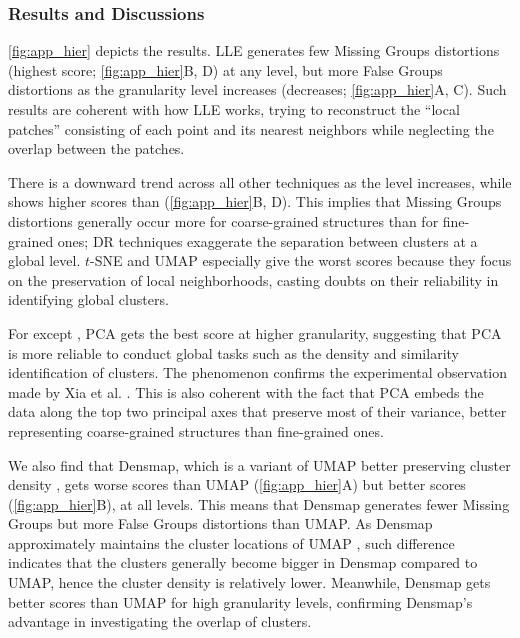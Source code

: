 \subsubsection{Results and Discussions}
\autoref{fig:app_hier} depicts the results. 
LLE generates few Missing Groups distortions (highest \lc score; \autoref{fig:app_hier}B, D) at any level, but more False Groups distortions as the granularity level increases (\lt decreases; \autoref{fig:app_hier}A, C). 
Such results are coherent with how LLE works, trying to reconstruct the ``local patches'' consisting of each point and its nearest neighbors while neglecting the overlap between the patches. 

There is a \lc downward trend across all other techniques as the level increases,
while \lc [DSC] shows higher scores than \lc [\CHb{}] (\autoref{fig:app_hier}B, D). 
This implies that Missing Groups distortions generally occur more for coarse-grained structures than for fine-grained ones; DR techniques exaggerate the separation between clusters at a global level.
$t$-SNE and UMAP especially give the worst  \lc scores because they focus on the preservation of local neighborhoods, casting doubts on their reliability in identifying global clusters. 

For \ltc except \lc [\CHb{}], PCA gets the best score at higher  granularity, suggesting that PCA is more reliable to conduct global tasks such as the density and similarity identification of clusters.
The phenomenon confirms the experimental observation made by Xia et al. \cite{xia22tvcg}. This is also coherent with the fact that PCA embeds the data along the top two principal axes that preserve most of their variance, better representing coarse-grained structures than fine-grained ones.


We also find that Densmap, which is a variant of UMAP better preserving cluster density \cite{narayan21nature}, gets worse \lt [\CHb{}] scores than UMAP (\autoref{fig:app_hier}A) but better \lc [\CHb{}] scores (\autoref{fig:app_hier}B), at all levels.
This means that Densmap generates fewer Missing Groups but more False Groups distortions than UMAP.
As Densmap approximately maintains the cluster locations of UMAP \cite{narayan21nature}, such difference indicates that the clusters generally become bigger in Densmap compared to UMAP, hence the cluster density is relatively lower. 
Meanwhile, Densmap gets better \ltc [DSC] scores than UMAP for high granularity levels, confirming Densmap's advantage in investigating the overlap of clusters. 


